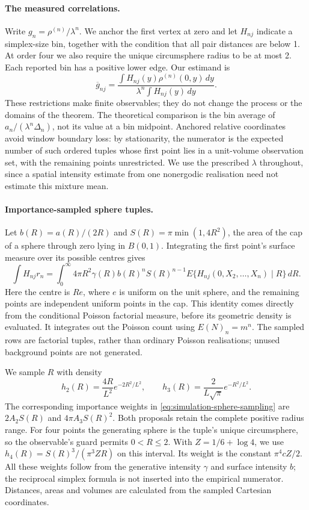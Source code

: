 \paragraph{The measured correlations.}
Write $g_n=\rho^{(n)}/\lambda^n$. We anchor the first vertex at zero and
let $H_{nj}$ indicate a simplex-size bin, together with the condition that
all pair distances are below 1. At order four we also require the unique
circumsphere radius to be at most 2. Each reported bin has a positive lower
edge. Our estimand is
\begin{equation}
 \overline g_{nj}=
 \frac{\int H_{nj}(y)\rho^{(n)}(0,y)\,dy}
      {\lambda^n\int H_{nj}(y)\,dy}.
 \label{eq:simulation-estimand}
\end{equation}
These restrictions make finite observables; they do not change the process
or the domains of the theorem. The theoretical comparison is the bin average
of $a_n/(\lambda^n\Delta_n)$, not its value at a bin midpoint. Anchored
relative coordinates avoid window boundary loss: by stationarity, the
numerator is the expected number of such ordered tuples whose first point
lies in a unit-volume observation set, with the remaining points unrestricted.
We use the prescribed $\lambda$ throughout, since a spatial intensity
estimate from one nonergodic realisation need not estimate this mixture mean.

\paragraph{Importance-sampled sphere tuples.}
Let $b(R)=a(R)/(2R)$ and $S(R)=\pi\min(1,4R^2)$, the area of the cap of a
sphere through zero lying in $B(0,1)$. Integrating the first point's surface
measure over its possible centres gives
\begin{equation}
 \int H_{nj}r_n
 =\int_0^\infty 4\pi R^2\gamma(R)b(R)^n S(R)^{n-1}
       E\{H_{nj}(0,X_2,\ldots,X_n)\mid R\}\,dR.
 \label{eq:simulation-sphere-sampling}
\end{equation}
Here the centre is $Re$, where $e$ is uniform on the unit sphere, and the
remaining points are independent uniform points in the cap. This identity
comes directly from the conditional Poisson factorial measure, before its
geometric density is evaluated. It integrates out the Poisson count using
$E(N)_n=m^n$. The sampled rows are factorial tuples, rather than ordinary
Poisson realisations; unused background points are not generated.

We sample $R$ with density
\[
 h_2(R)=\frac{4R}{L^2}e^{-2R^2/L^2},\qquad
 h_3(R)=\frac{2}{L\sqrt\pi}e^{-R^2/L^2}.
\]
The corresponding importance weights in
\eqref{eq:simulation-sphere-sampling} are $2A_2S(R)$ and
$4\pi A_3S(R)^2$. Both proposals retain the complete positive radius range.
For four points the generating sphere is the tuple's unique circumsphere,
so the observable's guard permits $0<R\leq2$. With
$Z=1/6+\log4$, we use $h_4(R)=S(R)^3/(\pi^3ZR)$ on this interval.
Its weight is the constant $\pi^4cZ/2$. All these weights follow from the
generative intensity $\gamma$ and surface intensity $b$; the reciprocal
simplex formula is not inserted into the empirical numerator. Distances,
areas and volumes are calculated from the sampled Cartesian coordinates.

